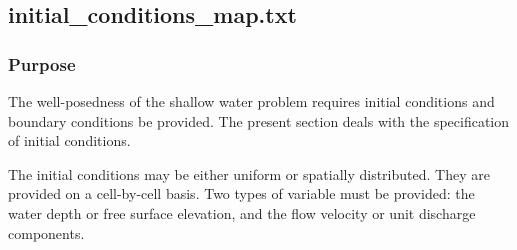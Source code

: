 \hypertarget{InitialConditionsFileFormat}{}
\subsection{initial\_conditions\_map.txt\label{sec_initialConditionsMap}}

%
\subsubsection{Purpose}
The well-posedness of the shallow water problem requires initial conditions and boundary conditions be provided. The present section deals with the specification of initial conditions.

The initial conditions may be either uniform or spatially distributed. They are provided on a cell-by-cell basis. Two types of variable must be provided: the water depth or free surface elevation, and the flow velocity or unit discharge components.

%
